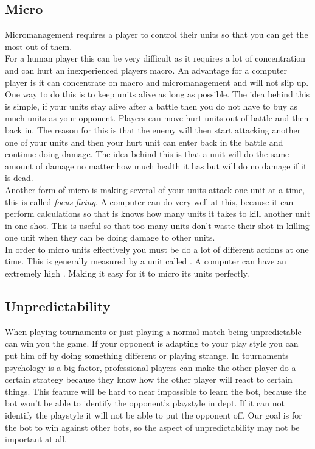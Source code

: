 				
	\subsection{Micro}
		Micromanagement requires a player to control their units so that you can get the most out of them.\\
		
		For a human player this can be very difficult as it requires a lot of concentration and can hurt an inexperienced players macro. 
		An advantage for a computer player is it can concentrate on macro and micromanagement and will not slip up.\\
		
		One way to do this is to keep units alive as long as possible. 
		The idea behind this is simple, if your units stay alive after a battle then you do not have to buy as much units as your opponent. 
		Players can move hurt units out of battle and then back in. 
		The reason for this is that the enemy will then start attacking another one of your 
		units and then your hurt unit can enter back in the battle and continue doing damage. 
		The idea behind this is that a unit will do the same amount of damage no matter how much health it has but will do no damage if it is dead.\\
		
		Another form of micro is making several of your units attack one unit at a time, this is called {\it focus firing}.
		A computer can do very well at this, because it can perform calculations so that is knows how many units it takes to kill another unit in one shot.
		This is useful so that too many units don't waste their shot in killing one unit when they can be doing damage to other units.\\
		In order to micro units effectively you must be do a lot of different actions at one time. 
		This is generally measured by a unit called \abapm. 
		A computer can have an extremely high \abapm. Making it easy for it to micro its units perfectly.
		
	\subsection{Unpredictability}
		When playing tournaments or just playing a normal match being unpredictable can win you the game. 
		If your opponent is adapting to your play style you can put him off by doing something different or playing strange.
		In tournaments psychology is a big factor, professional players can make the other player do a certain strategy because they know 
		how the other player will react to certain things. This feature will be hard to near impossible to learn the bot, because the bot won't be able to 
		identify the opponent's playstyle in dept. 
		If it can not identify the playstyle it will not be able to put the opponent off. Our goal is for the bot 
		to win against other bots, so the aspect of unpredictability may not be important at all. 
